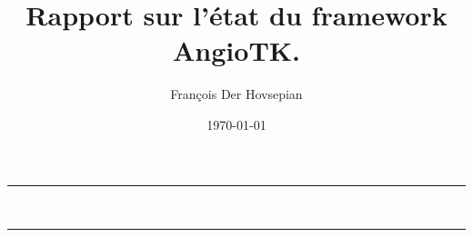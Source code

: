 \documentclass[a4paper]{report}
\title{Rapport sur l'état du framework AngioTK.}
\author{François Der Hovsepian}
\date{\today}
\begin{document}
\makeatletter

\begin{titlepage}

\centering
\Large

\vfill

\vfill
\hrule
\vfill

\Huge\@title\\
\vfill

\huge
\hrule
\vfill
\small\@author\\
\vfill

\end{titlepage}
 
\makeatother




%
%

\tableofcontents













\nocite{*}
\printbibliography
\end{document}

